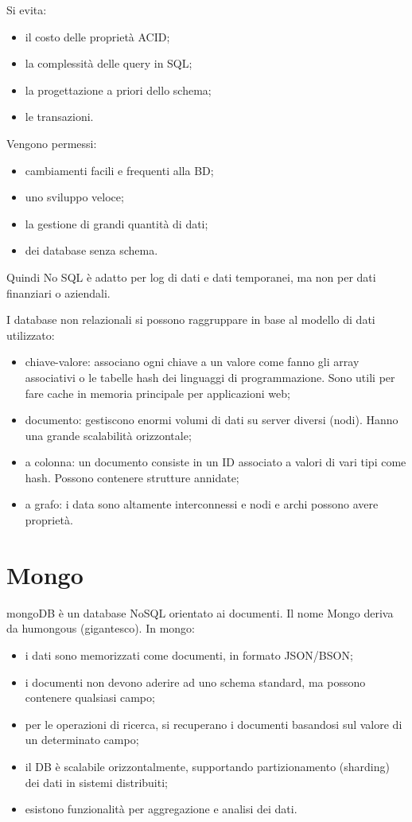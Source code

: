 Si evita:
\begin{itemize}
    \item il costo delle proprietà ACID;
    \item la complessità delle query in SQL;
    \item la progettazione a priori dello schema;
    \item le transazioni.
\end{itemize}

Vengono permessi:
\begin{itemize}
    \item cambiamenti facili e frequenti alla BD;
    \item uno sviluppo veloce;
    \item la gestione di grandi quantità di dati;
    \item dei database senza schema.
\end{itemize}

Quindi No SQL è adatto per log di dati e dati temporanei, ma non per dati finanziari o aziendali.

I database non relazionali si possono raggruppare in base al modello di dati utilizzato:
\begin{itemize}
    \item chiave-valore: associano ogni chiave a un valore come fanno gli array associativi o le tabelle hash dei linguaggi di programmazione. Sono utili per fare cache in memoria principale per applicazioni web;
    \item documento: gestiscono enormi volumi di dati su server diversi (nodi). Hanno una grande scalabilità orizzontale;
    \item a colonna: un documento consiste in un ID associato a valori di vari tipi come hash. Possono contenere strutture annidate;
    \item a grafo: i data sono altamente interconnessi e nodi e archi possono avere proprietà.
\end{itemize}

\section{Mongo}

mongoDB è un database NoSQL orientato ai documenti. Il nome Mongo deriva da humongous (gigantesco). In mongo:

\begin{itemize}
    \item i dati sono memorizzati come documenti, in formato JSON/BSON;
    \item i documenti non devono aderire ad uno schema standard, ma possono contenere qualsiasi campo;
    \item per le operazioni di ricerca, si recuperano i documenti basandosi sul valore di un determinato campo;
    \item il DB è scalabile orizzontalmente, supportando partizionamento (sharding) dei dati in sistemi distribuiti;
    \item esistono funzionalità per aggregazione e analisi dei dati.
\end{itemize}
